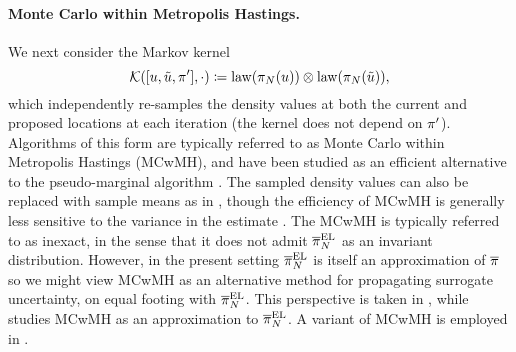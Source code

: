 \documentclass[12pt]{article}
\begin{document}
\paragraph{Monte Carlo within Metropolis Hastings.}
We next consider the Markov kernel 
\begin{equation}
\postSampleKernel([\Par, \propPar, \postDens^\prime], \cdot)
\Def \mathrm{law}(\postEm[\Ndesign](\Par)) \otimes \mathrm{law}(\postEm[\Ndesign](\propPar)),
\end{equation}
which independently re-samples the density values at both the current and proposed locations
at each iteration (the kernel does not depend on $\postDens^\prime$). Algorithms of this form are 
typically referred to as Monte Carlo within Metropolis Hastings (MCwMH), and have been studied as an
efficient alternative to the pseudo-marginal algorithm \citep{noisyMCMC,stabilityNoisyMH}.
The sampled density values can also be replaced with sample means as in ,
though the efficiency of MCwMH is generally less sensitive to the variance in the estimate
\citep{garegnani2021NoisyMCMC,stabilityNoisyMH}.
The MCwMH is typically referred to as inexact, in the sense that it does not admit 
$\postApproxNormMarg[\Ndesign]$ as an invariant distribution. However, in the present setting
$\postApproxNormMarg[\Ndesign]$ is itself an approximation of $\postDensNorm$ so we might
view MCwMH as an alternative method for propagating surrogate uncertainty, 
on equal footing with $\postApproxNormMarg[\Ndesign]$. This perspective is taken in 
\citet{surrogateNoisyMCMC}, while \citet{garegnani2021NoisyMCMC} studies MCwMH
as an approximation to $\postApproxNormMarg[\Ndesign]$. A variant of MCwMH
is employed in \citet{FerEmulation}.
\end{document}
